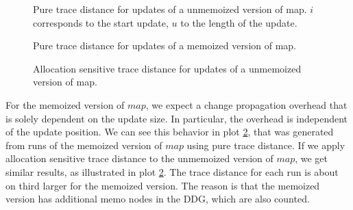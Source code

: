 \begin{figure}
\centering
{}
\caption{Pure trace distance for updates of a unmemoized version of map. $i$ corresponds to the start update, $u$ to the length of the update.}
\label{plot:unmemoized_map_pure}
\end{figure}


\begin{figure}
\centering
{}
\caption{Pure trace distance for updates of a memoized version of map.}
\label{plot:memoized_map_pure}
\end{figure}


\begin{figure}
\centering
{}
\caption{Allocation sensitive trace distance for updates of a unmemoized version of map.}
\label{plot:unmemoized_map_alloc}
\end{figure}

For the memoized version of $map$, we expect a change propagation overhead that is solely dependent on the update size. In particular, the overhead is independent of the update position. We can see this behavior in plot \ref{plot:memoized_map_pure}, that was generated from runs of the memoized version of $map$ using pure trace distance. If we apply allocation sensitive trace distance to the unmemoized version of $map$, we get similar results, as illustrated in plot \ref{plot:memoized_map_pure}. The trace distance for each run is about on third larger for the memoized version. The reason is that the memoized version has additional memo nodes in the DDG, which are also counted. 


